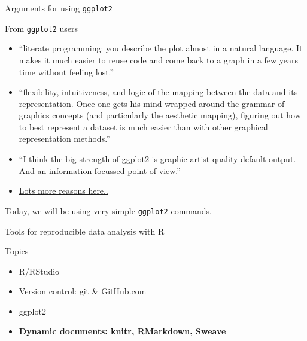 \documentclass[table]{beamer}\usepackage[]{graphicx}\usepackage[]{color}
\begin{document}
\begin{frame}{Arguments for using {\tt ggplot2}}

\begin{block}{From {\tt ggplot2} users}
\begin{itemize}
\item ``literate programming: you describe the plot almost in a natural language. It makes it much easier to reuse code and come back to a graph in a few years time without feeling lost.''
\item ``flexibility, intuitiveness, and logic of the mapping between the data and its representation. Once one gets his mind wrapped around the grammar of graphics concepts (and particularly the aesthetic mapping), figuring out how to best represent a dataset is much easier than with other graphical representation methods.'' 
\item ``I think the big strength of ggplot2 is graphic-artist quality default output. And an information-focussed point of view.''
\item \href{https://github.com/hadley/ggplot2/wiki/Why-use-ggplot2}{Lots more reasons here..}
\end{itemize}
\end{block}

Today, we will be using very simple {\tt ggplot2} commands.

\end{frame}

\begin{frame}{Tools for reproducible data analysis with R}

\begin{block}{Topics}
\begin{itemize}
        \item R/RStudio
       \item Version control: git \& GitHub.com
         \item ggplot2
        \item \textbf{Dynamic documents: knitr, RMarkdown, Sweave}
 \end{itemize}
\end{block}

\end{frame}
\end{document}

